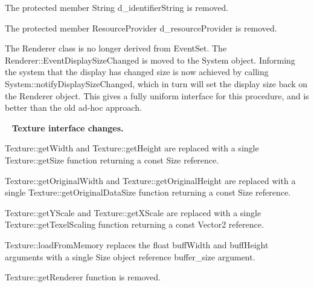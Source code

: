 \begin{DoxyItemize}
\item The protected member String {\ttfamily d\+\_\+identifier\+String} is removed.
\item The protected member Resource\+Provider {\ttfamily d\+\_\+resource\+Provider} is removed.
\item The Renderer class is no longer derived from Event\+Set. The {\ttfamily Renderer\+::\+Event\+Display\+Size\+Changed} is moved to the System object. Informing the system that the display has changed size is now achieved by calling System\+::notify\+Display\+Size\+Changed, which in turn will set the display size back on the Renderer object. This gives a fully uniform interface for this procedure, and is better than the old ad-\/hoc approach.
\end{DoxyItemize}

~\newline
 {\bfseries{Texture interface changes.}}
\begin{DoxyItemize}
\item {\ttfamily Texture\+::get\+Width} and {\ttfamily Texture\+::get\+Height} are replaced with a single Texture\+::get\+Size function returning a const Size reference.
\item {\ttfamily Texture\+::get\+Original\+Width} and {\ttfamily Texture\+::get\+Original\+Height} are replaced with a single Texture\+::get\+Original\+Data\+Size function returning a const Size reference.
\item {\ttfamily Texture\+::get\+Y\+Scale} and {\ttfamily Texture\+::get\+X\+Scale} are replaced with a single Texture\+::get\+Texel\+Scaling function returning a const Vector2 reference.
\item Texture\+::load\+From\+Memory replaces the float {\ttfamily buff\+Width} and {\ttfamily buff\+Height} arguments with a single Size object reference {\ttfamily buffer\+\_\+size} argument.
\item {\ttfamily Texture\+::get\+Renderer} function is removed.
\end{DoxyItemize}

